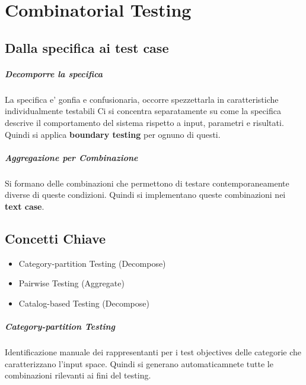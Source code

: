 \chapter{Combinatorial Testing}

\section{Dalla specifica ai test case}

\paragraph{Decomporre la specifica}

La specifica e' gonfia e confusionaria, occorre spezzettarla in caratteristiche individualmente testabili
Ci si concentra separatamente su come la specifica descrive il comportamento del sistema rispetto a input, parametri e risultati.
Quindi si applica \textbf{boundary testing} per ognuno di questi.

\paragraph{Aggregazione per Combinazione}

Si formano delle combinazioni che permettono di testare contemporaneamente diverse di queste condizioni.
Quindi si implementano queste combinazioni nei \textbf{text case}.

\section{Concetti Chiave}

\begin{itemize}
    \item Category-partition Testing (Decompose)
    \item Pairwise Testing (Aggregate)
    \item Catalog-based Testing (Decompose)
\end{itemize}

\paragraph{Category-partition Testing}

Identificazione manuale dei rappresentanti per i test objectives delle categorie che caratterizzano l'input space.
Quindi si generano automaticamnete tutte le combinazioni rilevanti ai fini del testing.

